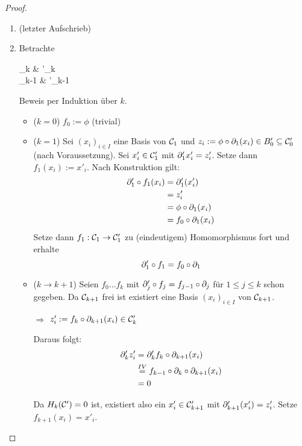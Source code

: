 \begin{proof}
	\begin{enumerate}
		\item (letzter Aufschrieb)
		\item Betrachte
		
		\begin{center}
		\begin{cd}
			\C_k \ar[r, "f_k"] & \C'_k \ar[d, "\del'_k"] \\
			\C_{k-1} \ar[r, "f_{k-1}"] & \C'_{k-1}
		\end{cd}
		\end{center}
		Beweis per Induktion über $k$.
		\begin{itemize}
			\item ($k = 0$) $f_0 := \phi$ (trivial)
			\item ($k = 1$) Sei $(x_i)_{i \in I}$ eine Basis von $\mathcal{C}_1$ und $z_i := \phi \circ \partial_1(x_i) \in B'_0 \subseteq \mathcal{C}'_0$ (nach Voraussetzung).
			Sei $x'_i \in \mathcal{C}'_1$ mit $\partial'_1 x'_i = z'_i$.
			Setze dann $f_1(x_i) := x'_i$. Nach Konstruktion gilt:
			\begin{align*}
				\partial'_1 \circ f_1 (x_i) &= \partial'_1(x'_i) \\
				&= z'_i \\
				&= \phi \circ \partial_1 (x_i) \\
				&= f_0 \circ \partial_1 (x_i)
			\end{align*}
			Setze dann $f_1 : \mathcal{C}_1 \rightarrow \mathcal{C}'_1$ zu (eindeutigem) Homomorphismus fort und erhalte
			\begin{equation*}
				\partial'_1 \circ f_1 = f_0 \circ \partial_1
			\end{equation*}
			\item ($k \rightarrow k + 1$) Seien $f_0 \ldots f_k$ mit $\partial'_j \circ f_j = f_{j-1} \circ \partial_j$  für $ 1 \leq j \leq k$ schon gegeben.
			Da $\mathcal{C}_{k+1}$ frei ist existiert eine Basis $(x_i)_{i\in I}$ von $\mathcal{C}_{k+1}$.
			
			$\Rightarrow$ $z'_i := f_k \circ \partial_{k+1}(x_i) \in \mathcal{C}'_{k}$
			
			Daraus folgt:
			\begin{align*}
				\partial'_k z'_i &= \partial'_k f_k \circ \partial_{k+1}(x_i)  \\
				&\overset{IV}{=} f_{k-1} \circ \partial_k \circ \partial_{k+1} (x_i) \\
				&= 0
			\end{align*}
			
			Da $H_k(\mathcal{C}') = 0$ ist, existiert also ein $x'_i \in \mathcal{C}'_{k+1}$ mit $\partial'_{k+1}(x'_i) = z'_i$.
			Setze $f_{k+1}(x_i) = x'_i$.
			

\end{itemize}
\end{enumerate}
\end{proof}
